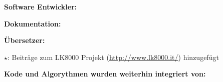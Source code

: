 {\large\bf Software Entwickler:}
\begin{compactitem}

\end{compactitem}

\vspace{1em}
{\large\bf Dokumentation:}
\begin{compactitem}

\end{compactitem}

\vspace{1em}
{\large\bf Übersetzer:}
\begin{compactitem}

\end{compactitem}

$\star$:  Beiträge zum  LK8000 Projekt (\url{http://www.lk8000.it/}) hinzugefügt

\vspace{1em}
{\large\bf Kode und Algorythmen wurden weiterhin integriert von:}
\begin{description}

\end{description}
